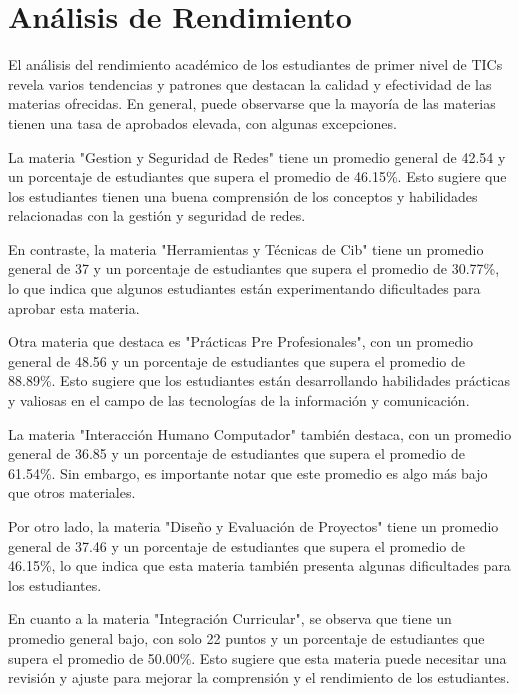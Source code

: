 \vspace{1cm}
\section{Análisis de Rendimiento}
El análisis del rendimiento académico de los estudiantes de primer nivel de TICs revela varios tendencias y patrones que destacan la calidad y efectividad de las materias ofrecidas. En general, puede observarse que la mayoría de las materias tienen una tasa de aprobados elevada, con algunas excepciones.

La materia "Gestion y Seguridad de Redes" tiene un promedio general de 42.54 y un porcentaje de estudiantes que supera el promedio de 46.15\%. Esto sugiere que los estudiantes tienen una buena comprensión de los conceptos y habilidades relacionadas con la gestión y seguridad de redes.

En contraste, la materia "Herramientas y Técnicas de Cib" tiene un promedio general de 37 y un porcentaje de estudiantes que supera el promedio de 30.77\%, lo que indica que algunos estudiantes están experimentando dificultades para aprobar esta materia.

Otra materia que destaca es "Prácticas Pre Profesionales", con un promedio general de 48.56 y un porcentaje de estudiantes que supera el promedio de 88.89\%. Esto sugiere que los estudiantes están desarrollando habilidades prácticas y valiosas en el campo de las tecnologías de la información y comunicación.

La materia "Interacción Humano Computador" también destaca, con un promedio general de 36.85 y un porcentaje de estudiantes que supera el promedio de 61.54\%. Sin embargo, es importante notar que este promedio es algo más bajo que otros materiales.

Por otro lado, la materia "Diseño y Evaluación de Proyectos" tiene un promedio general de 37.46 y un porcentaje de estudiantes que supera el promedio de 46.15\%, lo que indica que esta materia también presenta algunas dificultades para los estudiantes.

En cuanto a la materia "Integración Curricular", se observa que tiene un promedio general bajo, con solo 22 puntos y un porcentaje de estudiantes que supera el promedio de 50.00\%. Esto sugiere que esta materia puede necesitar una revisión y ajuste para mejorar la comprensión y el rendimiento de los estudiantes.

